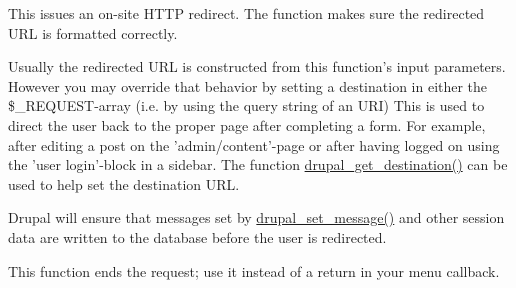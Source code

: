 This issues an on-\/site HTTP redirect. The function makes sure the redirected URL is formatted correctly.

Usually the redirected URL is constructed from this function's input parameters. However you may override that behavior by setting a destination in either the \$\_\-REQUEST-\/array (i.e. by using the query string of an URI) This is used to direct the user back to the proper page after completing a form. For example, after editing a post on the 'admin/content'-\/page or after having logged on using the 'user login'-\/block in a sidebar. The function \hyperlink{group__http__handling_ga0c95c16e75ac4df882686daccc1f8ac5}{drupal\_\-get\_\-destination()} can be used to help set the destination URL.

Drupal will ensure that messages set by \hyperlink{bootstrap_8inc_ad9223d86c7b08b1288274ce211d9bfa6}{drupal\_\-set\_\-message()} and other session data are written to the database before the user is redirected.

This function ends the request; use it instead of a return in your menu callback.



